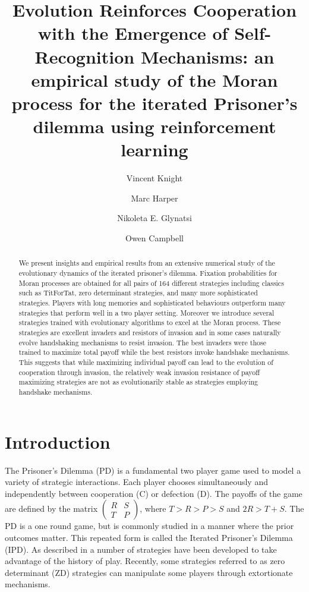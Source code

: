 \documentclass{article}
\title{Evolution Reinforces Cooperation with the Emergence of Self-Recognition
       Mechanisms: an empirical study of the Moran process for the iterated
       Prisoner's dilemma using reinforcement learning}
\author{Vincent Knight \and
        Marc Harper \and
        Nikoleta E. Glynatsi \and
        Owen Campbell} %
\date{}
\begin{document}
\maketitle

\begin{abstract}
    We present insights and empirical results from an extensive numerical
    study of the evolutionary dynamics of the iterated prisoner's dilemma.
    Fixation probabilities for Moran processes are obtained
    for all pairs of 164 different strategies including classics such as TitForTat, zero
    determinant strategies, and many more sophisticated strategies.
    Players with long memories and sophisticated behaviours outperform
    many strategies that perform well in a two player setting. Moreover we
    introduce several strategies trained with evolutionary algorithms to
    excel at the Moran process. These strategies are excellent invaders
    and resistors of invasion and in some cases naturally evolve handshaking
    mechanisms to resist invasion. The best invaders were those trained
    to maximize total payoff while the best resistors invoke handshake mechanisms.
    This suggests that while maximizing individual payoff
    can lead to the evolution of cooperation through invasion, the relatively
    weak invasion resistance of payoff maximizing strategies are not as
    evolutionarily stable as strategies employing handshake mechanisms.
\end{abstract}

\section{Introduction}\label{sec:introduction}

The Prisoner's Dilemma (PD) \cite{Flood1958} is a fundamental two player game
used to model a variety of strategic interactions. Each player chooses
simultaneously and independently
between cooperation (C) or defection (D). The payoffs of
the game are defined by the matrix $\begin{pmatrix} R & S \\ T & P
\end{pmatrix}$, where $T > R > P > S$ and $2R > T + S$. The PD is a one
round game, but is commonly studied in a manner where the prior outcomes
matter. This repeated form is called the Iterated Prisoner's
Dilemma (IPD). As described in \cite{Axelrod1980a, Knight2016, Press2012} a
number of strategies have been developed to take advantage of the history of
play. Recently, some strategies referred to as zero determinant (ZD) strategies
\cite{Press2012} can manipulate some players through extortionate mechanisms.
\end{document}
